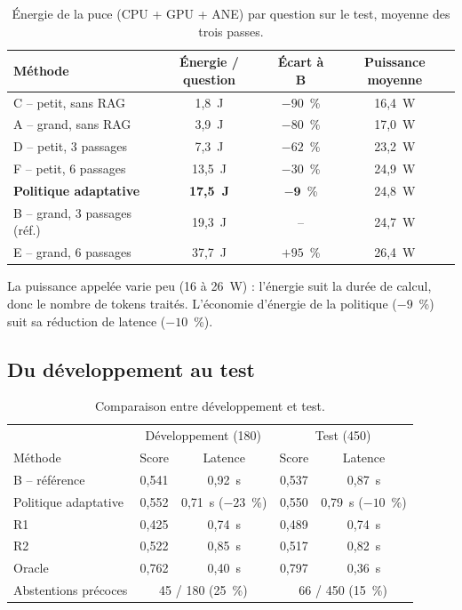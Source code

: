 \documentclass[11pt,a4paper]{article}
\begin{document}
\begin{table}[H]
\centering\small
\begin{tabular}{l c c c}
\toprule
Méthode & Énergie / question & Écart à B & Puissance moyenne \\
\midrule
C -- petit, sans RAG & 1,8~J & $-90$~\% & 16,4~W \\
A -- grand, sans RAG & 3,9~J & $-80$~\% & 17,0~W \\
D -- petit, 3 passages & 7,3~J & $-62$~\% & 23,2~W \\
F -- petit, 6 passages & 13,5~J & $-30$~\% & 24,9~W \\
\textbf{Politique adaptative} & \textbf{17,5~J} & $\mathbf{-9}$~\% & 24,8~W \\
B -- grand, 3 passages (réf.) & 19,3~J & -- & 24,7~W \\
E -- grand, 6 passages & 37,7~J & $+95$~\% & 26,4~W \\
\bottomrule
\end{tabular}
\caption{Énergie de la puce (CPU + GPU + ANE) par question sur le test, moyenne des trois passes.}
\label{tab:energie}
\end{table}

La puissance appelée varie peu (16 à 26~W) : l'énergie suit la durée de calcul, donc le nombre de tokens
traités. L'économie d'énergie de la politique ($-9$~\%) suit sa réduction de latence ($-10$~\%).

\subsection{Du développement au test}

\begin{table}[H]
\centering\small
\begin{tabular}{l c c c c}
\toprule
& \multicolumn{2}{c}{Développement (180)} & \multicolumn{2}{c}{Test (450)} \\
Méthode & Score & Latence & Score & Latence \\
\midrule
B -- référence & 0,541 & 0,92~s & 0,537 & 0,87~s \\
Politique adaptative & 0,552 & 0,71~s ($-23$~\%) & 0,550 & 0,79~s ($-10$~\%) \\
R1 & 0,425 & 0,74~s & 0,489 & 0,74~s \\
R2 & 0,522 & 0,85~s & 0,517 & 0,82~s \\
Oracle & 0,762 & 0,40~s & 0,797 & 0,36~s \\
\midrule
Abstentions précoces & \multicolumn{2}{c}{45 / 180 (25~\%)} & \multicolumn{2}{c}{66 / 450 (15~\%)} \\
\bottomrule
\end{tabular}
\caption{Comparaison entre développement et test.}
\label{tab:dev-test}
\end{table}
\end{document}
